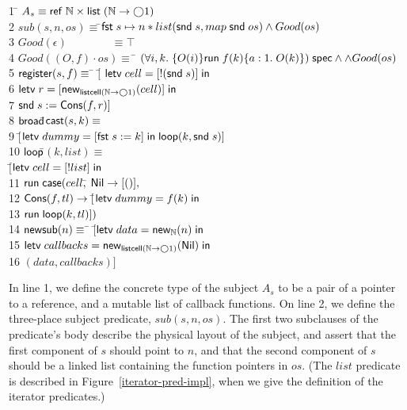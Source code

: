 \begin{tabbing}
1 \qquad \= $A_s \equiv \mathsf{ref}\;\mathbb{N} \times \mathsf{list}\;{(\mathbb{N} \to \bigcirc{1})}$
\\[0.5em]
2 \> $sub(s, n, os) \equiv$\=$ \mathsf{fst}\; s \mapsto n * 
              list(\mathsf{snd}\; s, map\; \mathsf{snd}\; os) \land Good(os)$ 
\\[0.5em]
3 \> $Good(\epsilon) \!\qquad\qquad \equiv \top$ \\
4 \> $Good((O,f)\cdot os) \equiv\; $\=
   ${(\forall i,k.\; \{{O(i)}\}{\mathsf{run}\;{f(k)}}\{{a:1}.\;{O(k)}\})}\;\mathsf{spec} \land \land Good(os)$ 
\\[0.5em]

5 \> $\mathsf{register}(s, f) \equiv$ \=
         $[$\= $\mathsf{letv}\;cell = [!(\mathsf{snd}\; s)]\;\mathsf{in}\;$ \\
6 \> \> \> $\mathsf{letv}\;r = [\mathsf{new}_{\mathsf{listcell}{(\mathbb{N} \to \bigcirc{1})}}(cell)]\;\mathsf{in}\;$ \\
7 \> \> \> $\mathsf{snd}\; s := \mathsf{Cons}(f, r)]$
\\[0.5em]

8  \> $\mathsf{broad}$\=$\mathsf{cast}(s, k) \equiv$ \\
9  \>  \> $[$\=$\mathsf{letv}\;dummy = [\mathsf{fst}\; s := k]\;\mathsf{in}\;\mathsf{loop}(k, \mathsf{snd}\; s)]$ 
\\[0.5em]


10 \> $\mathsf{loop}$\=$(k, list) \equiv $\\
   \>         \>$[$\=$\mathsf{letv}\;cell = [!list]\;\mathsf{in}\;$ \\
11 \>\>\> $\mathsf{run}\;{}\mathsf{case}(cell,$\= 
            $\mathsf{Nil} \to [()],$ \\
12 \>\>\>\> $\mathsf{Cons}(f, tl) \to [$\=$\mathsf{letv}\;dummy = f(k)\;\mathsf{in}\;$ \\
13  \>\>\>\> \> $\mathsf{run}\;{\mathsf{loop}(k,tl)}])$ \\[0.5em]

14 \> $\mathsf{new}\mathsf{sub}(n) \equiv$ \=
          $[$\=$\mathsf{letv}\;data = \mathsf{new}_{\mathbb{N}}(n)\;\mathsf{in}\;$ \\
15 \> \> \> $\mathsf{letv}\;callbacks = \mathsf{new}_{\mathsf{listcell}{(\mathbb{N} \to \bigcirc{1})}}(\mathsf{Nil})\;\mathsf{in}\;$ \\
16 \> \> \> $(data, callbacks)]$
\end{tabbing}


In line 1, we define the concrete type of the subject $A_s$ to be a
pair of a pointer to a reference, and a mutable list of callback
functions. On line 2, we define the three-place subject predicate,
$sub(s,n,os)$. The first two subclauses of the predicate's body
describe the physical layout of the subject, and assert that the first
component of $s$ should point to $n$, and that the second component of
$s$ should be a linked list containing the function pointers in
$os$. (The $list$ predicate is described in
Figure~\ref{iterator-pred-impl}, when we give the definition of the
iterator predicates.)

